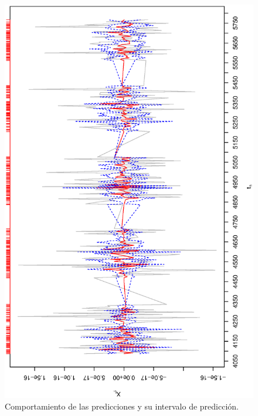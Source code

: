 \begin{figure}[h]
    \begin{minipage}{0.45\textwidth}
    \includegraphics[width=0.8\linewidth,angle = 270]{Kap3/Fig_Cap3/agn_ajuste_bandas.eps}
    \caption{Comportamiento de las predicciones y su intervalo de predicción.}
    \label{fig:example_agn_fit}
    \end{minipage}
    \hfill
    \begin{minipage}{0.45\textwidth}

\end{minipage}
\end{figure}
